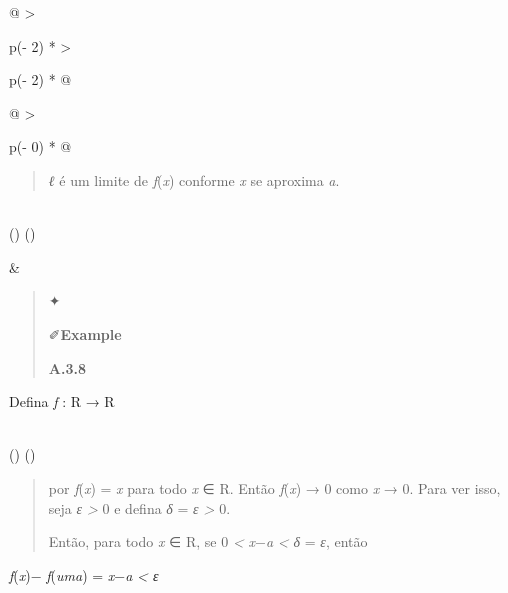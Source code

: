 \documentclass[
]{article}
\begin{document}
\begin{longtable}[]{@{}
  >{\raggedright\arraybackslash}p{(\columnwidth - 2\tabcolsep) * }
  >{\raggedright\arraybackslash}p{(\columnwidth - 2\tabcolsep) * }@{}}
\begin{minipage}[b]{\linewidth}
\begin{longtable}[]{@{}
  >{\raggedright\arraybackslash}p{(\columnwidth - 0\tabcolsep) * }@{}}
\begin{minipage}[b]{\linewidth}
\begin{quote}
\emph{ℓ} é um limite de \emph{f}(\emph{x}) conforme \emph{x} se aproxima
\emph{a}.
\end{quote}\strut
\end{minipage} \\
\midrule()
\endhead
\bottomrule()
\end{longtable}\strut
\end{minipage} & \begin{minipage}[b]{\linewidth}\raggedright
\begin{quote}
✦

✐\textbf{Example}

\textbf{A.3.8}
\end{quote}

Defina \emph{f} : R → R
\end{minipage} \\
\midrule()
\endhead
\bottomrule()
\end{longtable}

\begin{quote}
por \emph{f}(\emph{x}) = \emph{x} para todo \emph{x} ∈ R. Então
\emph{f}(\emph{x}) → 0 como \emph{x} → 0. Para ver isso, seja \emph{ε
\textgreater{}} 0 e defina \emph{δ} = \emph{ε \textgreater{}} 0.

Então, para todo \emph{x} ∈ R, se 0 \emph{\textless{}}
\textbar{}\emph{x}−\emph{a}\textbar{} \emph{\textless{} δ} = \emph{ε},
então
\end{quote}

\textbar{}\emph{f}(\emph{x})− \emph{f}(\emph{uma})\textbar{} =
\textbar{}\emph{x}−\emph{a}\textbar{} \emph{\textless{} ε}
\end{document}
